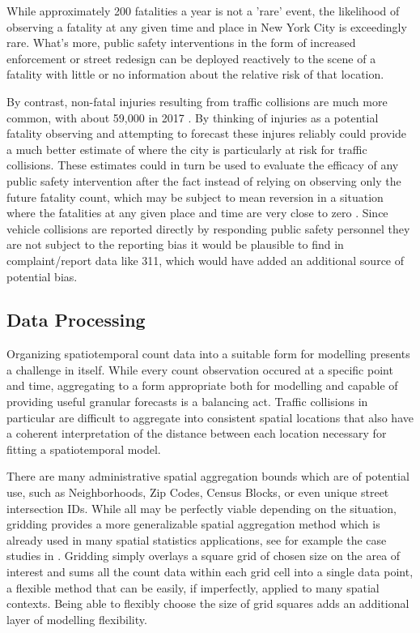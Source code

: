 While approximately 200 fatalities a year is not a 'rare' event, the likelihood of observing a fatality at any given time and place in New York City is exceedingly rare. What's more, public safety interventions in the form of increased enforcement or street redesign can be deployed reactively to the scene of a fatality with little or no information about the relative risk of that location. \par

By contrast, non-fatal injuries resulting from traffic collisions are much more common, with about 59,000 in 2017 \cite{vzviz}. By thinking of injuries as a potential fatality observing and attempting to forecast these injures reliably could provide a much better estimate of where the city is particularly at risk for traffic collisions. These estimates could in turn be used to evaluate the efficacy of any public safety intervention after the fact instead of relying on observing only the future fatality count, which may be subject to mean reversion in a situation where the  fatalities at any given place and time are very close to zero \cite{auerbach}. Since vehicle collisions are reported directly by responding public safety personnel they are not subject to the reporting bias it would be plausible to find in complaint/report data like 311, which would have added an additional source of potential bias.\par

\subsection{Data Processing}

Organizing spatiotemporal count data into a suitable form for modelling presents a challenge in itself. While every count observation occured at a specific point and time, aggregating to a form appropriate both for modelling and capable of providing useful granular forecasts is a balancing act. Traffic collisions in particular are difficult to aggregate into consistent spatial locations that also have a coherent interpretation of the distance between each location necessary for fitting a spatiotemporal model. \par

There are many administrative spatial aggregation bounds which are of potential use, such as Neighborhoods, Zip Codes, Census Blocks, or even unique street intersection IDs. While all may be perfectly viable depending on the situation, gridding provides a more generalizable spatial aggregation method which is already used in many spatial statistics applications, see for example the case studies in \cite{blangiardo_2015}. Gridding simply overlays a square grid of chosen size on the area of interest and sums all the count data within each grid cell into a single data point, a flexible method that can be easily, if imperfectly, applied to many spatial contexts. Being able to flexibly choose the size of grid squares adds an additional layer of modelling flexibility. \par

